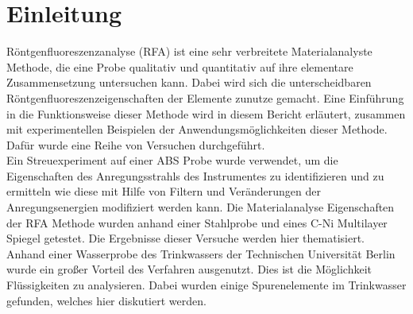 \section{Einleitung}
Röntgenfluoreszenzanalyse (RFA) ist eine sehr verbreitete Materialanalyste Methode, die eine Probe qualitativ und quantitativ auf ihre elementare Zusammensetzung untersuchen kann. Dabei wird sich die unterscheidbaren Röntgenfluoreszenzeigenschaften der Elemente zunutze gemacht. Eine Einführung in die Funktionsweise dieser Methode wird in diesem Bericht erläutert, zusammen mit experimentellen Beispielen der Anwendungsmöglichkeiten dieser Methode. Dafür wurde eine Reihe von Versuchen durchgeführt.\\
Ein Streuexperiment auf einer ABS Probe wurde verwendet, um die Eigenschaften des Anregungsstrahls des Instrumentes zu identifizieren und zu ermitteln wie diese mit Hilfe von Filtern und Veränderungen der Anregungsenergien modifiziert werden kann.
Die Materialanalyse Eigenschaften der RFA Methode wurden anhand einer Stahlprobe und eines C-Ni Multilayer Spiegel getestet. Die Ergebnisse dieser Versuche werden hier thematisiert. Anhand einer Wasserprobe des Trinkwassers der Technischen Universität Berlin wurde ein großer Vorteil des Verfahren ausgenutzt. Dies ist die Möglichkeit Flüssigkeiten zu analysieren. Dabei wurden einige Spurenelemente im Trinkwasser gefunden, welches hier diskutiert werden.

